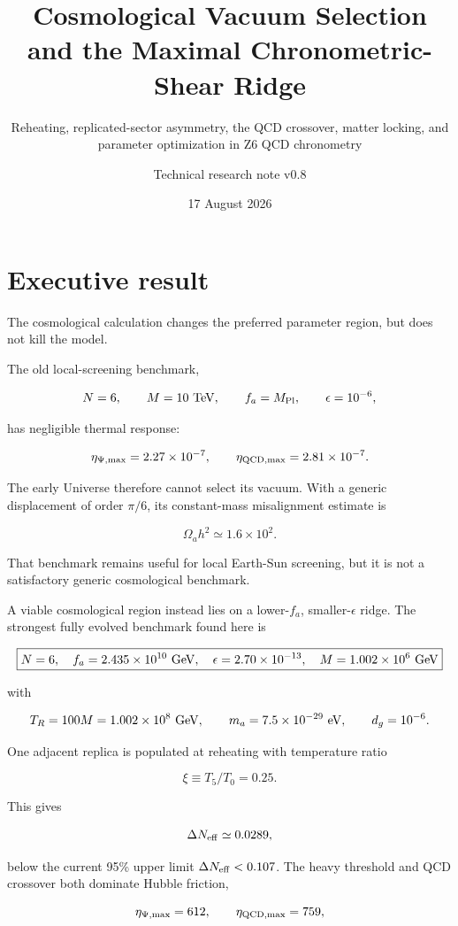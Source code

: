 \documentclass[
  10pt,
]{article}
\title{Cosmological Vacuum Selection and the Maximal Chronometric-Shear
Ridge}
\subtitle{Reheating, replicated-sector asymmetry, the QCD crossover,
matter locking, and parameter optimization in Z6 QCD chronometry}
\author{Technical research note v0.8}
\date{17 August 2026}
\begin{document}
\maketitle

{
\setcounter{tocdepth}{3}
\tableofcontents
}
\section{Executive result}\label{executive-result}

The cosmological calculation changes the preferred parameter region, but
does not kill the model.

The old local-screening benchmark,

\[
N=6,\qquad M=10\ {\rm TeV},\qquad f_a=M_{\rm Pl},\qquad \epsilon=10^{-6},
\]

has negligible thermal response:

\[
\eta_{\Psi,\max}=2.27\times10^{-7},\qquad
\eta_{\rm QCD,\max}=2.81\times10^{-7}.
\]

The early Universe therefore cannot select its vacuum. With a generic
displacement of order \(\pi/6\), its constant-mass misalignment estimate
is

\[
\Omega_a h^2\simeq 1.6\times10^2.
\]

That benchmark remains useful for local Earth-Sun screening, but it is
not a satisfactory generic cosmological benchmark.

A viable cosmological region instead lies on a lower-\(f_a\),
smaller-\(\epsilon\) ridge. The strongest fully evolved benchmark found
here is

\[
\boxed{
N=6,\quad
f_a=2.435\times10^{10}\ {\rm GeV},\quad
\epsilon=2.70\times10^{-13},\quad
M=1.002\times10^6\ {\rm GeV}
}
\]

with

\[
T_R=100M=1.002\times10^8\ {\rm GeV},\qquad
m_a=7.5\times10^{-29}\ {\rm eV},\qquad
d_g=10^{-6}.
\]

One adjacent replica is populated at reheating with temperature ratio

\[
\xi\equiv T_5/T_0=0.25.
\]

This gives

\[
\Delta N_{\rm eff}\simeq0.0289,
\]

below the current 95\% upper limit \(\Delta N_{\rm eff}<0.107\). The
heavy threshold and QCD crossover both dominate Hubble friction,

\[
\eta_{\Psi,\max}=612,
\qquad
\eta_{\rm QCD,\max}=759,
\]
\end{document}
